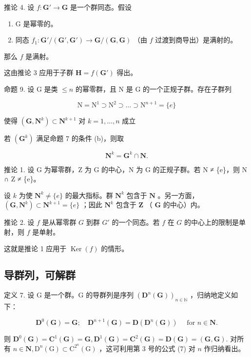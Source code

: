 推论 4. 设 \(f: \mathbf{G}' \to \mathbf{G}\) 是一个群同态。假设

\begin{enumerate}
\def\labelenumi{(\alph{enumi})}
\item
  G 是幂零的。
\item
  同态 \(f_1 \colon \mathbf{G}' / (\mathbf{G}', \mathbf{G}') \to \mathbf{G} / (\mathbf{G}, \mathbf{G})\) （由 \(f\) 过渡到商导出）是满射的。
\end{enumerate}

那么 \(f\) 是满射。

这由推论 3 应用于子群 \(\mathbf{H} = f(\mathbf{G}')\) 得出。

命题 9. 设 G 是类 \(\leqslant n\) 的幂零群，且 N 是 G 的一个正规子群。存在子群列

\[
\mathrm{N} = \mathrm{N} ^ {1} \supset \mathrm{N} ^ {2} \supset \dots \supset \mathrm{N} ^ {n + 1} = \{e \}
\]

使得 \((\mathbf{G},\mathbf{N}^k)\subset \mathbf{N}^{k + 1}\) 对 \(k = 1,\dots ,n\) 成立

若 \((\mathbf{G}^k)\) 满足命题 7 的条件 (b)，则取

\[
\mathbf {N} ^ {k} = \mathbf {G} ^ {k} \cap \mathbf {N}.
\]

推论 1. 设 G 为幂零群，Z 为 G 的中心，N 为 G 的正规子群。若 N ≠ \{e\}，则 N ∩ Z ≠ \{e\}。

设 \(k\) 为使 \(\mathbf{N}^k \neq \{e\}\) 的最大指标。群 \(\mathbf{N}^k\) 包含于 \(\mathbf{N}\) 。另一方面， \((\mathbf{G}, \mathbf{N}^k) \subset \mathbf{N}^{k+1} = \{e\}\) ；因此 \(\mathbf{N}^k\) 包含于 \(\mathbf{Z}\) （ \(\mathbf{G}\) 的中心）内。

推论 2. 设 \(f\) 是从幂零群 \(G\) 到群 \(G'\) 的一个同态。若 \(f\) 在 \(G\) 的中心上的限制是单射，则 \(f\) 是单射。

这就是推论 1 应用于 \(\operatorname{Ker}(f)\) 的情形。

\subsection{导群列，可解群}

定义 7. 设 G 是一个群。G 的导群列是序列 \((\mathbf{D}^n (\mathbf{G}))_{n\in \mathbb{N}}\) ，归纳地定义如下：

\[
\mathbf {D} ^ {0} (\mathbf {G}) = \mathbf {G}; \quad \mathbf {D} ^ {n + 1} (\mathbf {G}) = \mathbf {D} (\mathbf {D} ^ {n} (\mathbf {G})) \quad \text { for } n \in \mathbf {N}.
\]

则 \(\mathbf{D}^0 (\mathbf{G}) = \mathbf{C}^1 (\mathbf{G}) = \mathbf{G},\mathbf{D}^1 (\mathbf{G}) = \mathbf{C}^2 (\mathbf{G}) = \mathbf{D}(\mathbf{G}) = (\mathbf{G},\mathbf{G}).\) 对所有 \(n \in \mathbf{N}, \mathrm{D}^n(\mathrm{G}) \subset \mathrm{C}^{2^n}(\mathrm{G})\) ，这可利用第 3 号的公式 (7) 对 \(n\) 作归纳看出。

